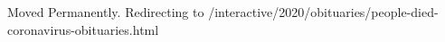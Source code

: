 Moved Permanently. Redirecting to
/interactive/2020/obituaries/people-died-coronavirus-obituaries.html
